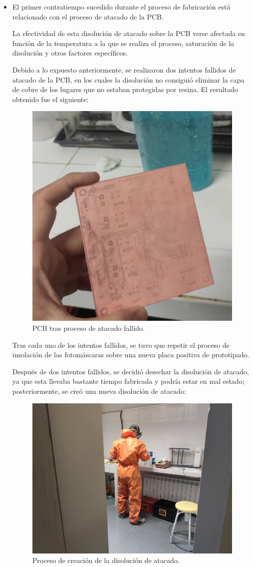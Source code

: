 \begin{itemize}
    \item El primer contratiempo sucedido durante el proceso de fabricación está relacionado con el proceso de atacado de la \ac{PCB}.
    
    La efectividad de esta disolución de atacado sobre la \ac{PCB} verse afectada en función de la temperatura a la que se realiza el proceso, saturación de la disolución y otros factores específicos.
    
    Debido a lo expuesto anteriormente, se realizaron dos intentos fallidos de atacado de la \ac{PCB}, en los cuales la disolución no consiguió eliminar la capa de cobre de los lugares que no estaban protegidas por resina. El resultado obtenido fue el siguiente:
    
    \begin{figure}[H]
    \centering 
    \includegraphics[width=0.55\linewidth]{pictures/FalloPCB.jpg}
    \caption{\ac{PCB} tras proceso de atacado fallido.}
    \end{figure}
    
    Tras cada uno de los intentos fallidos, se tuvo que repetir el proceso de insolación de las fotomáscaras sobre una nueva placa positiva de prototipado.
    
    Después de dos intentos fallidos, se decidió desechar la disolución de atacado, ya que esta llevaba bastante tiempo fabricada y podría estar en mal estado; posteriormente, se creó una nueva disolución de atacado:
    
    \begin{figure}[H]
    \centering 
    \includegraphics[width=0.65\linewidth]{pictures/BreakingBad.jpg}
    \caption{Proceso de creación de la disolución de atacado.}
    \end{figure}
    

\end{itemize}
